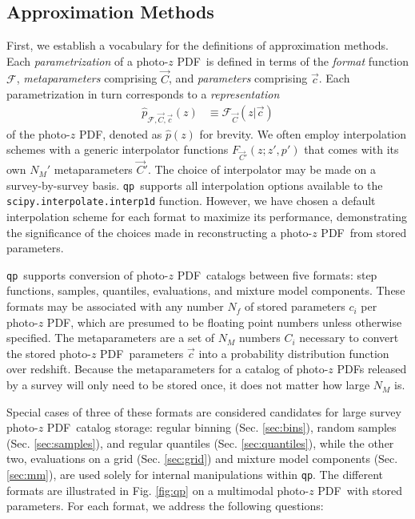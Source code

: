 \documentclass[\docopts]{\docclass}
\newcommand{\qp}{\texttt{qp}}
\newcommand{\pz}{photo-$z$ PDF}
\begin{document}
\subsection{Approximation Methods}
\label{sec:approx}


First, we establish a vocabulary for the definitions of approximation methods.  
Each \textit{parametrization} of a \pz\ is defined in terms of the 
\textit{format} function $\mathcal{F}$, \textit{metaparameters} comprising 
$\vec{C}$, and \textit{parameters} comprising $\vec{c}$.  Each parametrization 
in turn corresponds to a \textit{representation}
\begin{align}
  \label{eq:definition}
  \hat{p}_{\mathcal{F}, \vec{C}, \vec{c}}(z) &\equiv \mathcal{F}_{\vec{C}}(z | 
\vec{c})
\end{align}
of the \pz, denoted as $\hat{p}(z)$ for brevity.  We often employ interpolation 
schemes with a generic interpolator functions $F_{\vec{C}'}(z; z', p')$ that 
comes with its own $N_{M}'$ metaparameters $\vec{C}'$.  The choice of 
interpolator may be made on a survey-by-survey basis.  \qp\ supports all 
interpolation options available to the \texttt{scipy.interpolate.interp1d} 
function.  However, we have chosen a default interpolation scheme for each 
format to maximize its performance, demonstrating the significance of the 
choices made in reconstructing a \pz\ from stored parameters.

\qp\ supports conversion of \pz\ catalogs between five formats: step functions, 
samples, quantiles, evaluations, and mixture model components.  These formats 
may be associated with any number $N_{f}$ of stored parameters $c_{i}$ per \pz, 
which are presumed to be floating point numbers unless otherwise specified.  
The metaparameters are a set of $N_{M}$ numbers $C_{i}$ necessary to convert 
the stored \pz\ parameters $\vec{c}$ into a probability distribution function 
over redshift.  Because the metaparameters for a catalog of \pz s released by a 
survey will only need to be stored once, it does not matter how large $N_{M}$ 
is.

Special cases of three of these formats are considered candidates for large 
survey \pz\ catalog storage: regular binning (Sec. \ref{sec:bins}), random 
samples (Sec. \ref{sec:samples}), and regular quantiles (Sec. 
\ref{sec:quantiles}), while the other two, evaluations on a grid (Sec. 
\ref{sec:grid}) and mixture model components (Sec. \ref{sec:mm}), are used 
solely for internal manipulations within \qp.  The different formats are 
illustrated in Fig. \ref{fig:qp} on a multimodal \pz\ with stored parameters.  
For each format, we address the following questions:
\end{document}
